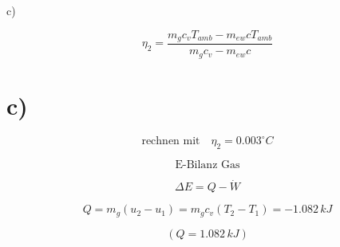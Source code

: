 c)
\]

\[
\eta_2 = \frac{m_g c_v T_{amb} - m_{ew} c T_{amb}}{m_g c_v - m_{ew} c}
\]



\section*{c)}

\[
\text{rechnen mit} \quad \eta_2 = 0.003^\circ C
\]

\[
\text{E-Bilanz Gas}
\]

\[
\Delta E = Q - \dot{W}
\]

\[
Q = m_g (u_2 - u_1) = m_g c_v (T_2 - T_1) = -1.082 \, kJ
\]

\[
(Q = 1.082 \, kJ)
\]